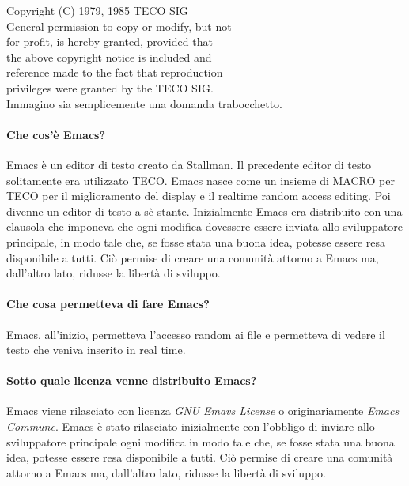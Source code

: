 \documentclass[a4paper]{article}
\begin{document}
			Copyright (C) 1979, 1985 TECO SIG\\
               General permission to copy or modify, but not\\
               for  profit, is hereby granted, provided that\\
               the above copyright notice  is  included  and\\
               reference  made to the fact that reproduction\\
               privileges were granted by the TECO SIG.\\
		
		
	       
		Immagino sia semplicemente una domanda trabocchetto.
	
		\paragraph{Che cos'è Emacs?} %
		Emacs è un editor di testo creato da Stallman. Il precedente editor di testo solitamente era utilizzato TECO. Emacs nasce come un insieme di MACRO per TECO per il miglioramento del display e il realtime random access editing. Poi divenne un editor di testo a sè stante. Inizialmente Emacs era distribuito con una clausola che imponeva che ogni modifica dovessere essere inviata allo sviluppatore principale, in modo tale che, se fosse stata una buona idea, potesse essere resa disponibile a tutti. Ciò permise di creare una comunità attorno a Emacs ma, dall'altro lato, ridusse la libertà di sviluppo.

		\paragraph{Che cosa permetteva di fare Emacs?}
		Emacs, all'inizio, permetteva l'accesso random ai file e permetteva di vedere il testo che veniva inserito in real time.

		\paragraph{Sotto quale licenza venne distribuito Emacs?}
		Emacs viene rilasciato con licenza \textit{GNU Emavs License} o originariamente \textit{Emacs Commune}.
		Emacs è stato rilasciato inizialmente con l'obbligo di inviare allo sviluppatore principale ogni modifica in modo tale che, se fosse stata una buona idea, potesse essere resa disponibile a tutti. Ciò permise di creare una comunità attorno a Emacs ma, dall'altro lato, ridusse la libertà di sviluppo.
		
\end{document}
